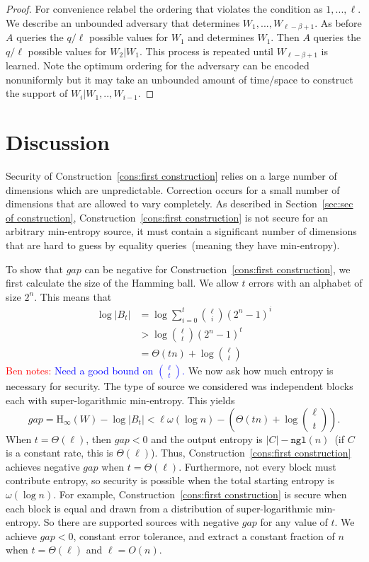 \documentclass[11pt]{article}
\newcommand{\secref}[1]{\mbox{Section~\ref{#1}}}
\newcommand{\consref}[1]{\mbox{Construction~\ref{#1}}}
\newcommand{\ngl}{\ensuremath{\mathtt{ngl}}\xspace}
\newcommand{\Hoo}{\mathrm{H}_\infty}
\newcommand{\authnote}[2]{{\textcolor{red}{\textsf{#1 notes: }\textcolor{blue}{ #2}}\marginpar{\textcolor{red}{\textbf{!!!!!}}}}}
\newcommand{\authnote}[2]{}
\newcommand{\bnote}[1]{{\authnote{Ben}{#1}}}
\begin{document}
\begin{proof}
For convenience relabel the ordering that violates the condition as $1,..., \ell$.  We describe an unbounded adversary that determines $W_1,..., W_{\ell-\beta+1}$.  As before $A$ queries the $q /\ell$ possible values for $W_1$ and determines $W_1$.  Then $A$ queries the $q/\ell$ possible values for $W_2 | W_1$.  This process is repeated until $W_{\ell-\beta+1}$ is learned.  Note the optimum ordering for the adversary can be encoded nonuniformly but it may take an unbounded amount of time/space to construct the support of $W_i | W_1,.., W_{i-1}$.
\end{proof}

\section{Discussion}
\label{sec:discussion}
Security of \consref{cons:first construction} relies on a large number of dimensions which are unpredictable.  Correction occurs for a small number of dimensions that are allowed to vary completely.  As described in \secref{sec:sec of construction}, \consref{cons:first construction} is not secure for an arbitrary min-entropy source, it must contain a significant number of dimensions that are hard to guess by equality queries~(meaning they have min-entropy).

To show that $gap$ can be negative for \consref{cons:first construction}, we first calculate the size of the Hamming ball.  We allow $t$ errors with an alphabet of size $2^n$.  This means that
\begin{align*}
\log |B_t| &= \log \sum_{i=0}^t {\ell \choose i} (2^n-1)^i\\
&> \log {\ell \choose t} (2^n-1)^t\\
&=\Theta(tn) + \log {\ell\choose t}
\end{align*}
\bnote{Need a good bound on ${\ell \choose t}$.}
We now ask how much entropy is necessary for security.  The type of source we considered was independent blocks each with super-logarithmic min-entropy.  This yields 
\[
gap = \Hoo(W) - \log |B_t| < \ell \omega(\log n) -\left( \Theta(t n) + \log {\ell \choose t}\right). 
\]
When $t =\Theta(\ell)$, then $gap<0$ and the output entropy is $|C| - \ngl(n)$~(if $C$ is a constant rate, this is $\Theta(\ell)$).
Thus, \consref{cons:first construction} achieves negative $gap$ when $t = \Theta(\ell)$.  Furthermore, not every block must contribute entropy, so security is possible when the total starting entropy is $\omega(\log n)$.  For example, \consref{cons:first construction} is secure when each block is equal and drawn from a distribution of super-logarithmic min-entropy.  So there are supported sources with negative $gap$ for any value of $t$.  We achieve $gap<0$, constant error tolerance, and extract a constant fraction of $n$ when $t = \Theta(\ell)$ and $\ell = O(n)$.
\end{document}
